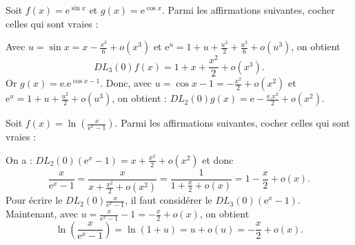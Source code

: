 \begin{question}
Soit $\displaystyle f(x)=\mathrm{e}^{\sin x}$ et $g(x)=\mathrm{e}^{\cos x}$. Parmi les affirmations suivantes, cocher celles qui sont vraies :
\begin{answers}
\end{answers}
\begin{explanations}
Avec $\displaystyle u=\sin x=x-\frac{x^3}{6}+o(x^3)$ et $\displaystyle \mathrm{e}^u=1+u+\frac{u^2}{2}+\frac{u^3}{6}+o(u^3)$, on obtient
$$\displaystyle DL_3(0)f(x)=1+x+\frac{x^2}{2}+o(x^3).$$
Or $\displaystyle g(x)=\mathrm{e}.\mathrm{e}^{\cos x-1}$. Donc, avec $\displaystyle u=\cos x-1=-\frac{x^2}{2}+o(x^2)$ et $\mathrm{e}^u=1+u+\frac{u^2}{2}+o(u^3)$, on obtient : $\displaystyle DL_2(0)g(x)=\mathrm{e}-\frac{\mathrm{e}.x^2}{2}+o(x^2)$.
\end{explanations}
\end{question}


\begin{question}
Soit $\displaystyle f(x)=\ln\left(\frac{x}{\mathrm{e}^x-1}\right)$. Parmi les affirmations suivantes, cocher celles qui sont vraies :
\begin{answers}
\end{answers}
\begin{explanations}
On a : $\displaystyle DL_2(0)(\mathrm{e}^x-1)=x+\frac{x^2}{2}+o(x^2)$ et donc
$$\frac{x}{\mathrm{e}^x-1}=\frac{x}{x+\frac{x^2}{2}+o(x^2)}=\frac{1}{1+\frac{x}{2}+o(x)}=1-\frac{x}{2}+o(x).$$
Pour écrire le $\displaystyle DL_2(0)\frac{x}{\mathrm{e}^x-1}$, il faut considérer le $DL_3(0)(\mathrm{e}^x-1)$. Maintenant, avec $\displaystyle u=\frac{x}{\mathrm{e}^x-1}-1=-\frac{x}{2}+o(x)$, on obtient 
$$\ln\left(\frac{x}{\mathrm{e}^x-1}\right)=\ln (1+u)=u+o(u)=-\frac{x}{2}+o(x).$$
\end{explanations}
\end{question}


